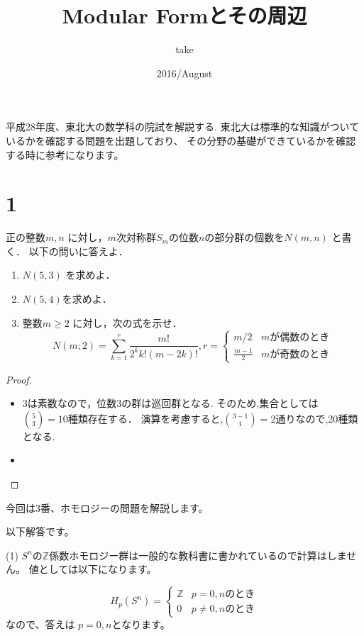 \documentclass{ujarticle}
\title{Modular Formとその周辺}
\author{take}
\date{2016/August}
\begin{document}
平成28年度、東北大の数学科の院試を解説する.
東北大は標準的な知識がついているかを確認する問題を出題しており、
その分野の基礎ができているかを確認する時に参考になります。


\section{1}
\label{sec:1}
正の整数$m,n$ に対し，$m$次対称群$S_m$の位数$n$の部分群の個数を$N(m,n)$ と書く．
以下の問いに答えよ．
\begin{enumerate}
  \item $N(5,3)$ を求めよ．
  \item  $N(5,4)$を求めよ．
  \item  整数$m \ge 2$ に対し，次の式を示せ．
  \begin{equation*}
    N(m; 2) =\sum^r_{k=1} \frac{m!}{2^kk!(m-2k)!},
    r =
    \begin{cases}
      m/2 & \text{$m$が偶数のとき}　\\
      \frac{m-1}{2} & \text{$m$が奇数のとき}
    \end{cases}
\end{equation*}
\end{enumerate}
\begin{proof}
  \begin{itemize}
    \item
  3は素数なので，位数3の群は巡回群となる.
  そのため,集合としては$\binom{5}{3}=10$種類存在する．
  演算を考慮すると,$\binom{3-1}{1}=2$通りなので,20種類となる.
  \item

  \end{itemize}

\end{proof}



今回は3番、ホモロジーの問題を解説します。

以下解答です。

(1)
$S^n$の$\mathbb{Z}$係数ホモロジー群は一般的な教科書に書かれているので計算はしません。
値としては以下になります。

\begin{equation*}
  H_p(S^n ) =
  \begin{cases}
    \mathbb{Z} & \text{$p =0,n$のとき}　\\
    0  & \text{$p  \neq 0,n$のとき}
  \end{cases}
\end{equation*}
なので、答えは
$p =0,n$となります。
\end{document}
